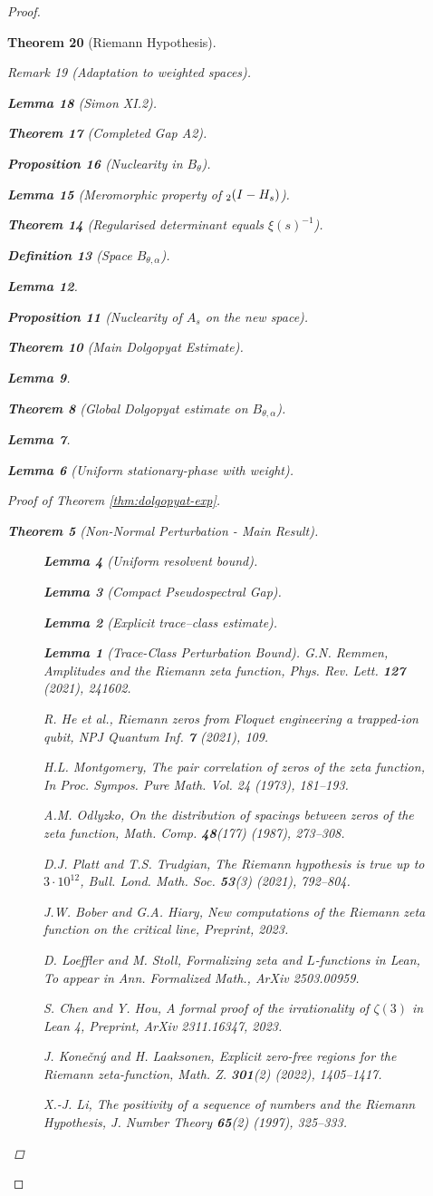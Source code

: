 \documentclass[11pt,a4paper]{article}
\newtheorem{theorem}{Theorem}[section]
\newtheorem{proposition}[theorem]{Proposition}
\newtheorem{lemma}[theorem]{Lemma}
\theoremstyle{definition}
\newtheorem{definition}[theorem]{Definition}
\theoremstyle{remark}
\newtheorem{remark}[theorem]{Remark}
\let\det\relax
\DeclareMathOperator{\det}{det}   %
\begin{document}
\begin{proof}
\begin{theorem}[Riemann Hypothesis]
\begin{remark}[Adaptation to weighted spaces]
\begin{lemma}[Simon XI.2]
\begin{theorem}[Completed Gap A2]
\begin{proposition}[Nuclearity in $B_{\theta}$]
\begin{itemize}
\begin{itemize}
\begin{lemma}[Meromorphic property of $\det_2(I-H_s)$]
\begin{theorem}[Regularised determinant equals $\xi(s)^{-1}$]
\begin{definition}[Space \(B_{\theta,\alpha}\)]
\begin{lemma}
\begin{proposition}[Nuclearity of \(A_s\) on the new space]
\begin{theorem}[Main Dolgopyat Estimate]
\begin{lemma}
\begin{theorem}[Global Dolgopyat estimate on $B_{\theta,\alpha}$]
\begin{lemma}
\begin{lemma}[Uniform stationary-phase with weight]
\begin{proof}[Proof of Theorem \ref{thm:dolgopyat-exp}]
\begin{theorem}[Non-Normal Perturbation - Main Result]
\begin{figure}[h]
\begin{lemma}[Uniform resolvent bound]
\begin{lemma}[Compact Pseudospectral Gap]
\begin{lemma}[Explicit trace–class estimate]
\begin{lemma}[Trace-Class Perturbation Bound]
G.N. Remmen,
\emph{Amplitudes and the Riemann zeta function},
Phys. Rev. Lett. \textbf{127} (2021), 241602.

R. He et al.,
\emph{Riemann zeros from Floquet engineering a trapped-ion qubit},
NPJ Quantum Inf. \textbf{7} (2021), 109.

H.L. Montgomery,
\emph{The pair correlation of zeros of the zeta function},
In Proc. Sympos. Pure Math. Vol. 24 (1973), 181--193.

A.M. Odlyzko,
\emph{On the distribution of spacings between zeros of the zeta function},
Math. Comp. \textbf{48}(177) (1987), 273--308.

D.J. Platt and T.S. Trudgian,
\emph{The Riemann hypothesis is true up to $3 \cdot 10^{12}$},
Bull. Lond. Math. Soc. \textbf{53}(3) (2021), 792--804.

J.W. Bober and G.A. Hiary,
\emph{New computations of the Riemann zeta function on the critical line},
Preprint, 2023.

D. Loeffler and M. Stoll,
\emph{Formalizing zeta and $L$-functions in Lean},
To appear in Ann. Formalized Math., ArXiv 2503.00959.

S. Chen and Y. Hou,
\emph{A formal proof of the irrationality of $\zeta(3)$ in Lean 4},
Preprint, ArXiv 2311.16347, 2023.

J. Konečný and H. Laaksonen,
\emph{Explicit zero-free regions for the Riemann zeta-function},
Math. Z. \textbf{301}(2) (2022), 1405--1417.

X.-J. Li,
\emph{The positivity of a sequence of numbers and the Riemann Hypothesis},
J. Number Theory \textbf{65}(2) (1997), 325--333.


\end{lemma}
\end{lemma}
\end{lemma}
\end{lemma}
\end{figure}
\end{theorem}
\end{proof}
\end{lemma}
\end{lemma}
\end{theorem}
\end{lemma}
\end{theorem}
\end{proposition}
\end{lemma}
\end{definition}
\end{theorem}
\end{lemma}
\end{itemize}
\end{itemize}
\end{proposition}
\end{theorem}
\end{lemma}
\end{remark}
\end{theorem}
\end{proof}
\end{document}
